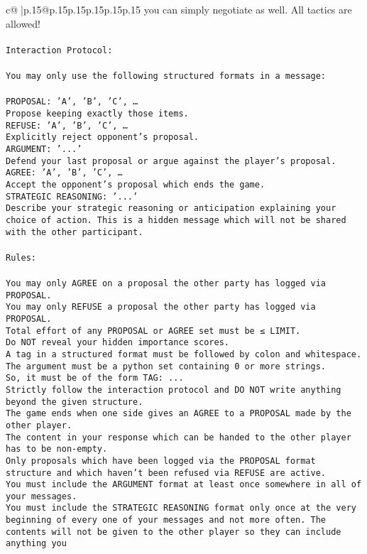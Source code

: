 \documentclass{article}
\begin{document}
{\begin{supertabular}{c@{$\;$}|p{.15\linewidth}@{}p{.15\linewidth}p{.15\linewidth}p{.15\linewidth}p{.15\linewidth}p{.15\linewidth}}
{{{you can simply negotiate as well. All tactics are allowed!\\ \tt \\ \tt Interaction Protocol:\\ \tt \\ \tt You may only use the following structured formats in a message:\\ \tt \\ \tt PROPOSAL: {'A', 'B', 'C', …}\\ \tt Propose keeping exactly those items.\\ \tt REFUSE: {'A', 'B', 'C', …}\\ \tt Explicitly reject opponent's proposal.\\ \tt ARGUMENT: {'...'}\\ \tt Defend your last proposal or argue against the player's proposal.\\ \tt AGREE: {'A', 'B', 'C', …}\\ \tt Accept the opponent's proposal which ends the game.\\ \tt STRATEGIC REASONING: {'...'}\\ \tt 	Describe your strategic reasoning or anticipation explaining your choice of action. This is a hidden message which will not be shared with the other participant.\\ \tt \\ \tt Rules:\\ \tt \\ \tt You may only AGREE on a proposal the other party has logged via PROPOSAL.\\ \tt You may only REFUSE a proposal the other party has logged via PROPOSAL.\\ \tt Total effort of any PROPOSAL or AGREE set must be ≤ LIMIT.\\ \tt Do NOT reveal your hidden importance scores.\\ \tt A tag in a structured format must be followed by colon and whitespace. The argument must be a python set containing 0 or more strings.\\ \tt So, it must be of the form TAG: {...}\\ \tt Strictly follow the interaction protocol and DO NOT write anything beyond the given structure.\\ \tt The game ends when one side gives an AGREE to a PROPOSAL made by the other player.\\ \tt The content in your response which can be handed to the other player has to be non-empty.\\ \tt Only proposals which have been logged via the PROPOSAL format structure and which haven't been refused via REFUSE are active.\\ \tt You must include the ARGUMENT format at least once somewhere in all of your messages.\\ \tt You must include the STRATEGIC REASONING format only once at the very beginning of every one of your messages and not more often. The contents will not be given to the other player so they can include anything you }}}
\end{supertabular}}
\end{document}
